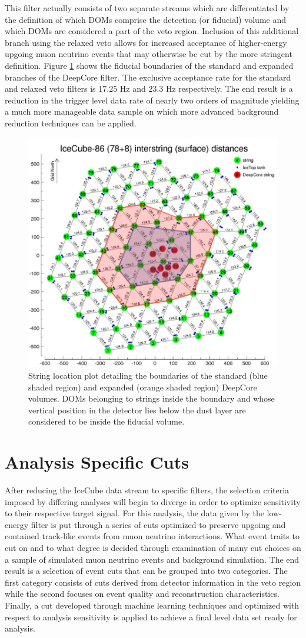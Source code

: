 \documentclass{gatech-thesis}
\begin{document}
This filter actually consists of two separate streams which are differentiated by the definition of which DOMs comprise the detection (or fiducial) volume and which DOMs are considered a part of the veto region. Inclusion of this additional branch using the relaxed veto allows for increased acceptance of higher-energy upgoing muon neutrino events that may otherwise be cut by the more stringent definition. Figure \ref{fig:TwoLayerDrawing} shows the fiducial boundaries of the standard and expanded branches of the DeepCore filter. The exclusive acceptance rate for the standard and relaxed veto filters is 17.25 Hz and 23.3 Hz respectively. The end result is a reduction in the trigger level data rate of nearly two orders of magnitude yielding a much more manageable data sample on which more advanced background reduction techniques can be applied.
\begin{figure}[ht]
  \begin{center}
    \includegraphics[width=.5\textwidth,keepaspectratio]{TwoLayerDC.png}
  \end{center}
  \caption[Fiducial Volume Definitions]{String location plot detailing the boundaries of the standard (blue shaded region) and expanded (orange shaded region) DeepCore volumes. DOMs belonging to strings inside the boundary and whose vertical position in the detector lies below the dust layer are considered to be inside the fiducial volume.}
  \label{fig:TwoLayerDrawing}
\end{figure}

\section{Analysis Specific Cuts}
After reducing the IceCube data stream to specific filters, the selection criteria imposed by differing analyses will begin to diverge in order to optimize sensitivity to their respective target signal. For this analysis, the data given by the low-energy filter is put through a series of cuts optimized to preserve upgoing and contained track-like events from muon neutrino interactions. What event traits to cut on and to what degree is decided through examination of many cut choices on a sample of simulated muon neutrino events and background simulation. The end result is a selection of event cuts that can be grouped into two categories. The first category consists of cuts derived from detector information in the veto region while the second focuses on event quality and reconstruction characteristics. Finally, a cut developed through machine learning techniques and optimized with respect to analysis sensitivity is applied to achieve a final level data set ready for analysis.
\end{document}
